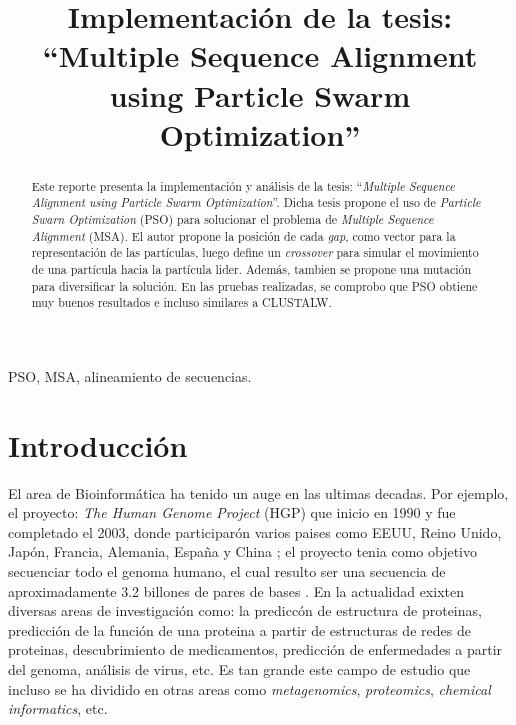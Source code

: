 \documentclass[conference]{IEEEtran}
\begin{document}
\title{Implementación de la tesis: \\``Multiple Sequence Alignment using Particle Swarm Optimization''}

\author{

}

\maketitle

\begin{abstract}
Este reporte presenta la implementación y análisis de la tesis: ``\textit{Multiple Sequence Alignment using Particle Swarm Optimization}''. Dicha tesis propone el uso de \textit{Particle Swarn Optimization} (PSO) para solucionar el problema de \textit{Multiple Sequence Alignment} (MSA). El autor propone la posición de cada \textit{gap}, como vector para la representación de las partículas, luego define un \textit{crossover} para simular el movimiento de una partícula hacia la partícula lider. Además, tambien se propone una mutación para diversificar la solución. En las pruebas realizadas, se comprobo que PSO obtiene muy buenos resultados e incluso similares a CLUSTALW.
\\
\end{abstract}

\begin{IEEEkeywords}
PSO, MSA, alineamiento de secuencias.
\end{IEEEkeywords}

\section{Introducción}
El area de Bioinformática ha tenido un auge en las ultimas decadas. Por ejemplo, el proyecto: \textit{The Human Genome Project} (HGP) que inicio en 1990 y fue completado el 2003, donde participarón varios paises como EEUU, Reino Unido, Japón, Francia, Alemania, España y China  \cite{hgp2021}; el proyecto tenia como objetivo secuenciar todo el genoma humano, el cual resulto ser una secuencia de aproximadamente 3.2 billones de pares de bases \cite{archibald2018genomics}. En la actualidad exixten diversas areas de investigación como: la prediccón de estructura de proteinas, predicción de la función de una proteina a partir de estructuras de redes de proteinas, descubrimiento de medicamentos, predicción de enfermedades a partir del genoma, análisis de virus, etc. Es tan grande este campo de estudio que incluso se ha dividido en otras areas como \textit{metagenomics}, \textit{proteomics}, \textit{chemical informatics}, etc. 
\end{document}
